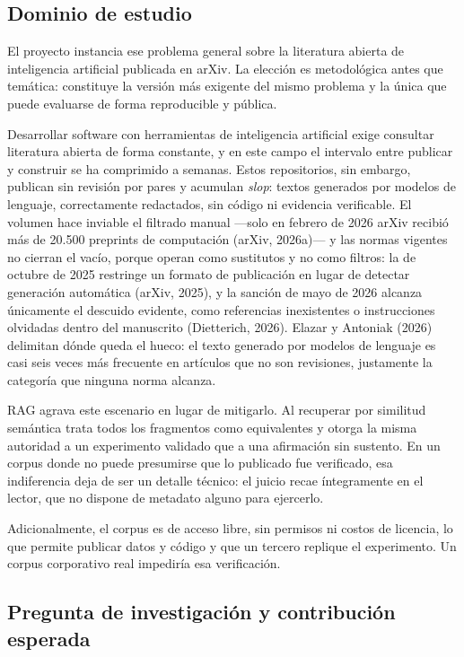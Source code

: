 \documentclass[11pt,letterpaper]{article}
\begin{document}
\subsection{Dominio de estudio}

El proyecto instancia ese problema general sobre la literatura abierta de inteligencia artificial
publicada en arXiv. La elección es metodológica antes que temática: constituye la versión más
exigente del mismo problema y la única que puede evaluarse de forma reproducible y pública.

Desarrollar software con herramientas de inteligencia artificial exige consultar literatura abierta
de forma constante, y en este campo el intervalo entre publicar y construir se ha comprimido a
semanas. Estos repositorios, sin embargo, publican sin revisión por pares y acumulan \textit{slop}:
textos generados por modelos de lenguaje, correctamente redactados, sin código ni evidencia
verificable. El volumen hace inviable el filtrado manual —solo en febrero de 2026 arXiv recibió más
de 20.500 preprints de computación (arXiv, 2026a)— y las normas vigentes no cierran el vacío, porque
operan como sustitutos y no como filtros: la de octubre de 2025 restringe un formato de publicación
en lugar de detectar generación automática (arXiv, 2025), y la sanción de mayo de 2026 alcanza
únicamente el descuido evidente, como referencias inexistentes o instrucciones olvidadas dentro del
manuscrito (Dietterich, 2026). Elazar y Antoniak (2026) delimitan dónde queda el hueco: el texto
generado por modelos de lenguaje es casi seis veces más frecuente en artículos que no son revisiones,
justamente la categoría que ninguna norma alcanza.

RAG agrava este escenario en lugar de mitigarlo. Al recuperar por similitud semántica trata todos los
fragmentos como equivalentes y otorga la misma autoridad a un experimento validado que a una
afirmación sin sustento. En un corpus donde no puede presumirse que lo publicado fue verificado, esa
indiferencia deja de ser un detalle técnico: el juicio recae íntegramente en el lector, que no dispone
de metadato alguno para ejercerlo.

Adicionalmente, el corpus es de acceso libre, sin permisos ni costos de licencia, lo que permite
publicar datos y código y que un tercero replique el experimento. Un corpus corporativo real
impediría esa verificación.

\subsection{Pregunta de investigación y contribución esperada}
\end{document}
